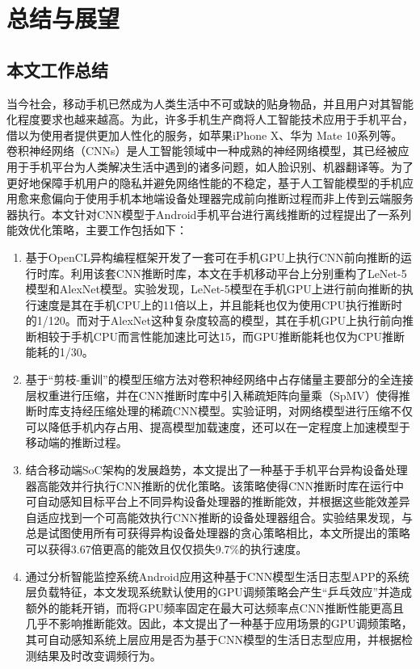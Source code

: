 \chapter{总结与展望}
\label{chapter:chapter6}
\section{本文工作总结}
当今社会，移动手机已然成为人类生活中不可或缺的贴身物品，并且用户对其智能化程度要求也越来越高。为此，许多手机生产商将人工智能技术应用于手机平台，借以为使用者提供更加人性化的服务，如苹果iPhone X、华为 Mate 10系列等。卷积神经网络（CNNs）是人工智能领域中一种成熟的神经网络模型，其已经被应用于手机平台为人类解决生活中遇到的诸多问题，如人脸识别、机器翻译等。为了更好地保障手机用户的隐私并避免网络性能的不稳定，基于人工智能模型的手机应用愈来愈偏向于使用手机本地端设备处理器完成前向推断过程而非上传到云端服务器执行。本文针对CNN模型于Android手机平台进行离线推断的过程提出了一系列能效优化策略，主要工作包括如下：
\begin{enumerate}
  \item 基于OpenCL异构编程框架开发了一套可在手机GPU上执行CNN前向推断的运行时库。利用该套CNN推断时库，本文在手机移动平台上分别重构了LeNet-5模型和AlexNet模型。实验发现，LeNet-5模型在手机GPU上进行前向推断的执行速度是其在手机CPU上的11倍以上，并且能耗也仅为使用CPU执行推断时的1/120。而对于AlexNet这种复杂度较高的模型，其在手机GPU上执行前向推断相较于手机CPU而言性能加速比可达15，而GPU推断能耗也仅为CPU推断能耗的1/30。
  \item 基于“剪枝-重训”的模型压缩方法对卷积神经网络中占存储量主要部分的全连接层权重进行压缩，并在CNN推断时库中引入稀疏矩阵向量乘（SpMV）使得推断时库支持经压缩处理的稀疏CNN模型。实验证明，对网络模型进行压缩不仅可以降低手机内存占用、提高模型加载速度，还可以在一定程度上加速模型于移动端的推断过程。
  \item 结合移动端SoC架构的发展趋势，本文提出了一种基于手机平台异构设备处理器高能效并行执行CNN推断的优化策略。该策略使得CNN推断时库在运行中可自动感知目标平台上不同异构设备处理器的推断能效，并根据这些能效差异自适应找到一个可高能效执行CNN推断的设备处理器组合。实验结果发现，与总是试图使用所有可获得异构设备处理器的贪心策略相比，本文所提出的策略可以获得3.67倍更高的能效且仅仅损失9.7\%的执行速度。
  \item 通过分析智能监控系统Android应用这种基于CNN模型生活日志型APP的系统层负载特征，本文发现系统默认使用的GPU调频策略会产生“乒乓效应”并造成额外的能耗开销，而将GPU频率固定在最大可达频率点CNN推断性能更高且几乎不影响推断能效。因此，本文提出了一种基于应用场景的GPU调频策略，其可自动感知系统上层应用是否为基于CNN模型的生活日志型应用，并根据检测结果及时改变调频行为。
\end{enumerate}


